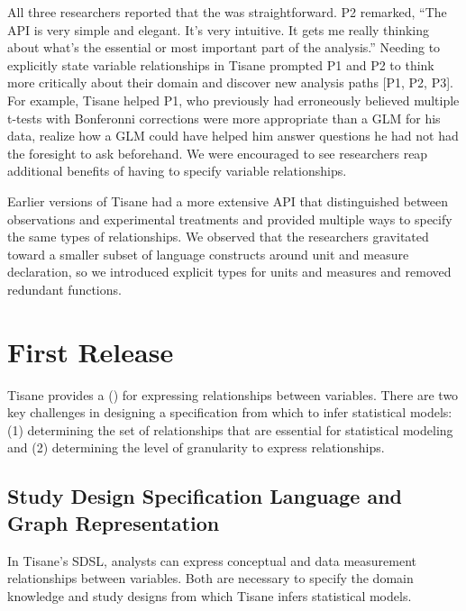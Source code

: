 All three researchers reported that the \SDSLlong %
was straightforward. P2 remarked, ``The API is very simple and elegant. It's
very intuitive. It gets me really thinking about what's the essential or most
important part of the analysis.'' Needing to explicitly state variable
relationships in Tisane prompted P1 and P2 to think more critically about their
domain and discover new analysis paths [P1, P2, P3]. For example, Tisane helped
P1, who previously had erroneously believed multiple t-tests with Bonferonni
corrections were more appropriate than a GLM for his data, realize how a GLM
could have helped him answer questions he had not had the foresight to ask
beforehand. %
We were encouraged to see researchers reap additional benefits of having to
specify variable relationships.

Earlier versions of Tisane had a more extensive API that distinguished between
observations and experimental treatments and provided multiple ways to specify
the same types of relationships. We observed that the researchers gravitated
toward a smaller subset of language constructs around unit and measure
declaration, so we introduced explicit types for units and measures and removed
redundant functions.

\tableStudyDesignTools

\section{First Release} \label{sec:tisane}

Tisane provides a \textit{\SDSLlong} (\textit{\SDSL}) for expressing
relationships between variables. There are two key challenges in designing a
specification from which to infer statistical models: (1) determining the set of
relationships that are essential for statistical modeling and (2) determining
the level of granularity to express relationships.

\subsection{Study Design Specification Language and Graph Representation} \label{sec:dsl}

In Tisane's SDSL, analysts can express conceptual and data measurement
relationships between variables. Both are necessary to specify the domain
knowledge and study designs from which Tisane infers statistical models.

